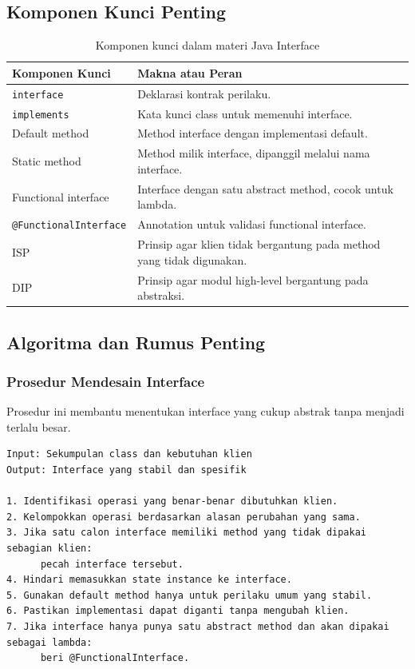 \subsection{Komponen Kunci Penting}

\begin{table}[H]
\centering
\begin{tabularx}{\textwidth}{|L{0.28\textwidth}|X|}
\hline
\textbf{Komponen Kunci} & \textbf{Makna atau Peran} \\
\hline
\texttt{interface} & Deklarasi kontrak perilaku. \\
\hline
\texttt{implements} & Kata kunci class untuk memenuhi interface. \\
\hline
Default method & Method interface dengan implementasi default. \\
\hline
Static method & Method milik interface, dipanggil melalui nama interface. \\
\hline
Functional interface & Interface dengan satu abstract method, cocok untuk lambda. \\
\hline
\texttt{@FunctionalInterface} & Annotation untuk validasi functional interface. \\
\hline
ISP & Prinsip agar klien tidak bergantung pada method yang tidak digunakan. \\
\hline
DIP & Prinsip agar modul high-level bergantung pada abstraksi. \\
\hline
\end{tabularx}
\caption{Komponen kunci dalam materi Java Interface}
\label{tab:komponen-kunci-java-interface}
\end{table}

\subsection{Algoritma dan Rumus Penting}

\subsubsection{Prosedur Mendesain Interface}

\begin{jawab}
Prosedur ini membantu menentukan interface yang cukup abstrak tanpa menjadi terlalu besar.
\end{jawab}

\begin{lstlisting}[caption={Pseudocode desain interface}, label={lst:desain-interface}]
Input: Sekumpulan class dan kebutuhan klien
Output: Interface yang stabil dan spesifik

1. Identifikasi operasi yang benar-benar dibutuhkan klien.
2. Kelompokkan operasi berdasarkan alasan perubahan yang sama.
3. Jika satu calon interface memiliki method yang tidak dipakai sebagian klien:
      pecah interface tersebut.
4. Hindari memasukkan state instance ke interface.
5. Gunakan default method hanya untuk perilaku umum yang stabil.
6. Pastikan implementasi dapat diganti tanpa mengubah klien.
7. Jika interface hanya punya satu abstract method dan akan dipakai sebagai lambda:
      beri @FunctionalInterface.
\end{lstlisting}

